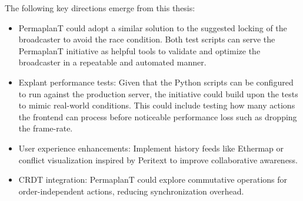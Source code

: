 \documentclass[final,oneside]{vutinfth}
\begin{document}
The following key directions emerge from this thesis:

\begin{itemize}
    \item PermaplanT could adopt a similar solution to the suggested locking of the broadcaster to avoid the race condition.
    Both test scripts can serve the PermaplanT initiative as helpful tools to validate and optimize the broadcaster in a repeatable and automated manner.
    \item Explant performance tests: Given that the Python scripts can be configured to run against the production server, the initiative could build upon the tests to mimic real-world conditions.
    This could include testing how many actions the frontend can process before noticeable performance loss such as dropping the frame-rate.
    \item User experience enhancements: Implement history feeds like Ethermap \cite{ethermap} or conflict visualization inspired by Peritext\cite{peritext} to improve collaborative awareness.
    \item CRDT integration: PermaplanT could explore commutative operations for order-independent actions, reducing synchronization overhead.
\end{itemize}


\backmatter



\end{document}
